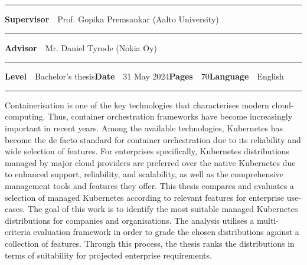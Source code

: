 \begin{spacing}{.88}
{\vspace{-2.4mm}\rule{\textwidth}{.75pt}

{\fontsize{10.5pt}{10.5pt}\bfseries\sffamily\lsstyle Supervisor}~~{\small Prof. Gopika Premsankar (Aalto University)}

\vspace{-2.4mm}\rule{\textwidth}{.75pt}

{\fontsize{10.5pt}{10.5pt}\bfseries\sffamily\lsstyle Advisor}~~{\small Mr. Daniel Tyrode (Nokia Oy)}

\vspace{-2.4mm}\rule{\textwidth}{.75pt}

{\fontsize{10.5pt}{10.5pt}\bfseries\sffamily\lsstyle Level}~~{\small Bachelor's thesis}\hfill{\fontsize{10.5pt}{10.5pt}\bfseries\sffamily\lsstyle Date}~~{\small 31 May 2024}\hfill{\fontsize{10.5pt}{10.5pt}\bfseries\sffamily\lsstyle Pages}~~{\small 70}\hfill{\fontsize{10.5pt}{10.5pt}\bfseries\sffamily\lsstyle Language}~~{\small English}

\vspace{-2.4mm}\rule{\textwidth}{.75pt}

\vspace{6mm}

} %
\end{spacing}
\begin{spacing}{1.05}

\vspace{.8mm}

{\small
  Containerisation is one of the key technologies that characterises modern cloud-computing. Thus, container orchestration frameworks have become increasingly important in recent years. Among the available technologies, Kubernetes has become the de facto standard for container orchestration due to its reliability and wide selection of features. For enterprises specifically, Kubernetes distributions managed by major cloud providers are preferred over the native Kubernetes due to enhanced support, reliability, and scalability, as well as the comprehensive management tools and features they offer. This thesis compares and evaluates a selection of managed Kubernetes according to relevant features for enterprise use-cases. The goal of this work is to identify the most suitable managed Kubernetes distributions for companies and organisations. The analysis utilises a multi-criteria evaluation framework in order to grade the chosen distributions against a collection of features. Through this process, the thesis ranks the distributions in terms of suitability for projected enterprise requirements.
}

\vfill

\end{spacing}

